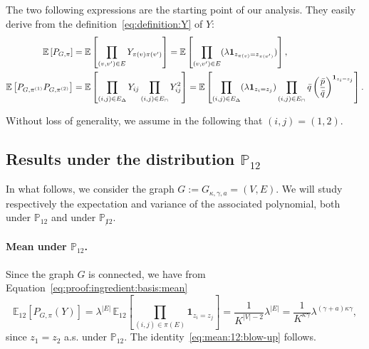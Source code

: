 \documentclass[final]{colt2026}
\newcommand{\1}{\mathbf{1}}
\newcommand{\bbE}{\mathbb{E}}
\newcommand{\bbP}{\mathbb{P}}
\newcommand{\pa}[1]{\left(#1\right)}
\newcommand{\cro}[1]{\left[#1\right]}
\begin{document}
The two following expressions are the starting point of our analysis. They easily derive from the definition~\eqref{eq:definition:Y} of $Y$:
\begin{align}
 \bbE\cro{P_{G, \pi}}&=    \bbE\cro{\prod_{(v,v')\in E }Y_{\pi(v)\pi(v')}}   \label{eq:proof:ingredient:basis:mean}
    =   \bbE\cro{\prod_{(v,v')\in E} (\lambda \mathbf{1}_{z_{\pi(v)}=z_{\pi(v')}})},\\
   \bbE\cro{P_{G, \pi^{(1)}}P_{G, \pi^{(2)}}} 
   &   = \bbE\cro{\prod_{(i,j)\in E_{\Delta}}Y_{ij}\prod_{(i,j)\in E_{\cap}}Y_{ij}^2}   \nonumber%
    =   \bbE\cro{\prod_{(i,j)\in E_{\Delta}} (\lambda \mathbf{1}_{z_{i}=z_{j}}) \prod_{(i,j)\in E_{\cap}}\bar q \pa{\bar p\over \bar q}^{ \mathbf{1}_{z_{i}=z_{j}}}}.
\end{align}

Without loss of generality,  we assume in the following that $(i,j)=(1,2)$.






\subsection{Results under the distribution $\bbP_{12}$}


In what follows, we consider the graph $G := G_{\kappa,\gamma,a}=(V,E)$.  We will study respectively the expectation and variance of the associated polynomial, both under $\bbP_{12}$ and under $\bbP_{\not 12}$. 


\paragraph{Mean under $\bbP_{12}$.}
Since the graph $G$ is connected, we have from Equation~\eqref{eq:proof:ingredient:basis:mean}
\begin{equation}\label{eq:mean:12:pi:blow-up}
\bbE_{12}\cro{P_{G,\pi}(Y)}= \lambda^{|E|} \,\bbE_{ 12}\cro{\prod_{(i,j)\in \pi(E)}\mathbf 1_{z_{i}=z_{j}}}= \frac{1}{K^{|V|-2}} \lambda^{|E|} = \frac{1}{K^{\kappa \gamma}} \lambda^{(\gamma+a)\kappa\gamma},
\end{equation}
since $z_{1}= z_{2}$ a.s. under  $\bbP_{12}$. The identity~\eqref{eq:mean:12:blow-up} follows. 
\end{document}
